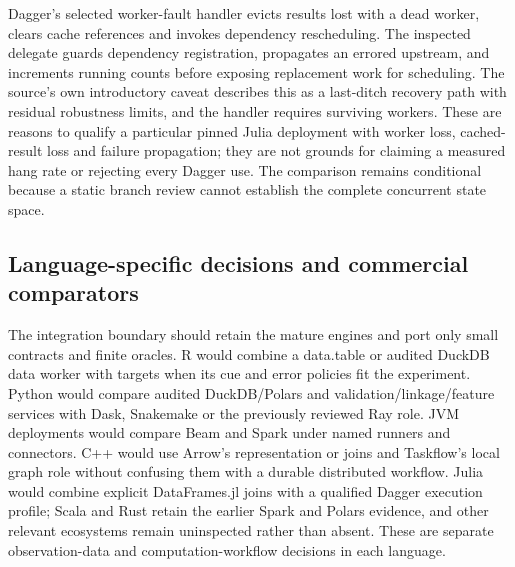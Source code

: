 Dagger's selected worker-fault handler evicts results lost with a dead worker, clears cache references and invokes dependency rescheduling. The inspected delegate guards dependency registration, propagates an errored upstream, and increments running counts before exposing replacement work for scheduling. The source's own introductory caveat describes this as a last-ditch recovery path with residual robustness limits, and the handler requires surviving workers. These are reasons to qualify a particular pinned Julia deployment with worker loss, cached-result loss and failure propagation; they are not grounds for claiming a measured hang rate or rejecting every Dagger use. The comparison remains conditional because a static branch review cannot establish the complete concurrent state space.~\citep{exec25_dww_dagger}

\subsection{Language-specific decisions and commercial comparators}

The integration boundary should retain the mature engines and port only small contracts and finite oracles. R would combine a data.table or audited DuckDB data worker with targets when its cue and error policies fit the experiment. Python would compare audited DuckDB/Polars and validation/linkage/feature services with Dask, Snakemake or the previously reviewed Ray role. JVM deployments would compare Beam and Spark under named runners and connectors. C++ would use Arrow's representation or joins and Taskflow's local graph role without confusing them with a durable distributed workflow. Julia would combine explicit DataFrames.jl joins with a qualified Dagger execution profile; Scala and Rust retain the earlier Spark and Polars evidence, and other relevant ecosystems remain uninspected rather than absent. These are separate observation-data and computation-workflow decisions in each language.~\citep{exec25_dww_datatable,exec25_dww_targets,exec25_dww_dask,exec25_dww_snakemake,exec25_dww_beam,exec25_dww_arrow,exec25_dww_taskflow,exec25_dww_dataframes,exec25_dww_dagger,exec25_otm_spark,exec25_otm_polars,exec25_dww_choice}

